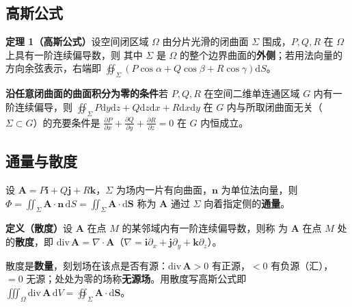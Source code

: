 \subsection{高斯公式}

\textbf{定理 1（高斯公式）}\quad 设空间闭区域 $\Omega$ 由分片光滑的闭曲面 $\Sigma$ 围成，$P,Q,R$ 在 $\Omega$ 上具有一阶连续偏导数，则
其中 $\Sigma$ 是 $\Omega$ 的整个边界曲面的\textbf{外侧}；若用法向量的方向余弦表示，右端即 $\oiint_\Sigma(P\cos\alpha+Q\cos\beta+R\cos\gamma)\mathrm{d}S$。

\textbf{沿任意闭曲面的曲面积分为零的条件}\quad 若 $P,Q,R$ 在空间二维单连通区域 $G$ 内有一阶连续偏导，则 $\oiint_\Sigma P\mathrm{d}y\mathrm{d}z+Q\mathrm{d}z\mathrm{d}x+R\mathrm{d}x\mathrm{d}y$ 在 $G$ 内与所取闭曲面无关（$\Sigma\subset G$）的充要条件是 $\frac{\partial P}{\partial x}+\frac{\partial Q}{\partial y}+\frac{\partial R}{\partial z}=0$ 在 $G$ 内恒成立。


\subsection{通量与散度}

设 $\boldsymbol A=P\boldsymbol i+Q\boldsymbol j+R\boldsymbol k$，$\Sigma$ 为场内一片有向曲面，$\boldsymbol n$ 为单位法向量，则 $\Phi=\iint_\Sigma\boldsymbol A\cdot\boldsymbol n\,\mathrm{d}S=\iint_\Sigma\boldsymbol A\cdot\mathrm{d}\boldsymbol S$ 称为 $\boldsymbol A$ 通过 $\Sigma$ 向着指定侧的\textbf{通量}。

\textbf{定义（散度）}\quad 设 $\boldsymbol A$ 在点 $M$ 的某邻域内有一阶连续偏导数，则称
为 $\boldsymbol A$ 在点 $M$ 处的\textbf{散度}，即 $\mathrm{div}\,\boldsymbol A=\nabla\cdot\boldsymbol A$（$\nabla=\boldsymbol i\partial_x+\boldsymbol j\partial_y+\boldsymbol k\partial_z$）。

散度是\textbf{数量}，刻划场在该点是否有源：$\mathrm{div}\,\boldsymbol A>0$ 有正源，$<0$ 有负源（汇），$=0$ 无源；处处为零的场称\textbf{无源场}。用散度写高斯公式即 $\iiint_\Omega\mathrm{div}\,\boldsymbol A\,\mathrm{d}V=\oiint_\Sigma\boldsymbol A\cdot\mathrm{d}\boldsymbol S$。

